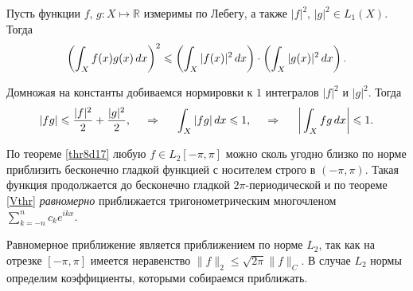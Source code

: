 


\textcolor{ugray}{
\begin{to_thr}
    Пусть функции $f,\, g \colon  X \mapsto \mathbb{R}$ измеримы по Лебегу, а также $|f|^2,\, |g|^2 \in L_1(X)$. Тогда
    \begin{equation*}
         \left(
            \int_X f(x) g(x) \, d x
         \right)^2 \leqslant \left(
            \int_X |f(x)|^2 \, d x
         \right) \cdot \left(
            \int_X |g(x)|^2 \, d x
         \right).
     \end{equation*} 
\end{to_thr}
}

\begin{uproof}
    Домножая на константы добиваемся нормировки к $1$ интегралов $|f|^2$ и $|g|^2$. Тогда 
    \begin{equation*}
        |fg| \leqslant \frac{|f|^2}{2} + \frac{|g|^2}{2},
        \hspace{0.5cm} \Rightarrow \hspace{0.5cm}
        \int_X |fg| \, d x \leqslant 1, \hspace{0.5cm} \Rightarrow \hspace{0.5cm}
        \bigg|
        \int_X fg \, d x
        \bigg| \leqslant 1.
    \end{equation*}
\end{uproof}

По теореме \ref{thr8d17} любую $f \in L_2[-\pi, \pi]$ можно сколь угодно близко по норме приблизить бесконечно гладкой функцией с носителем строго в $(-\pi, \pi)$. Такая функция продолжается до бесконечно гладкой $2\pi$-периодической и по теореме \ref{Vthr} \textit{равномерно} приближается тригонометрическим многочленом $\sum_{k=-n}^{n} c_k e^{ikx}$. 

Равномерное приближение является приближением по норме $L_2$, так как на отрезке $[-\pi, \pi]$ имеется неравенство $\|f\|_2 \leq \sqrt{2\pi} \|f\|_C$. В случае $L_2$ нормы определим коэффициенты, которыми собираемся приближать.


